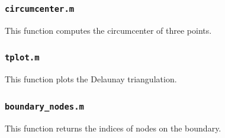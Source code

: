 \documentclass[10pt]{article}
\begin{document}


\subsubsection{{\tt circumcenter.m}}

This function computes the circumcenter of three points. 



\subsubsection{{\tt tplot.m}}

This function plots the Delaunay triangulation.



\subsubsection{{\tt boundary\_nodes.m}}

This function returns the indices of nodes on the boundary.


\end{document}
